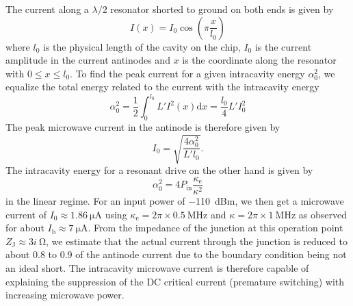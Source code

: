 The current along a $\lambda/2$ resonator shorted to ground on both ends is given by
%
\begin{equation}
I(x) = I_0\cos{\left(\pi\frac{x}{l_0}\right)}
\end{equation}
%
where $l_0$ is the physical length of the cavity on the chip, $I_0$ is the current amplitude in the current antinodes and $x$ is the coordinate along the resonator with $0 \leq x \leq l_0$.
%
To find the peak current for a given intracavity energy $\alpha_0^2$, we equalize the total energy related to the current with the intracavity energy
%
\begin{equation}
\alpha_0^2 = \frac{1}{2}\int_0^{l_0}L' I^2(x)\text{d}x = \frac{l_0}{4}L' I_0^2
\end{equation}
%
The peak microwave current in the antinode is therefore given by
%
\begin{equation}
I_0 = \sqrt{\frac{4 \alpha_0^2}{L' l_0}}.
\end{equation}
%
The intracavity energy for a resonant drive on the other hand is given by
%
\begin{equation}
\alpha_0^2 = 4P_\text{in} \frac{\kappa_\text{e}}{\kappa^2}
\end{equation}
%
in the linear regime.
%
For an input power of \SI{-110}{dBm}, we then get a microwave current of $I_0\approx\SI{1.86}{\micro\ampere}$ using $\kappa_\text{e} = 2\pi\times\SI{0.5}{\mega\hertz}$ and $\kappa = 2\pi\times\SI{1}{\mega\hertz}$ as observed for about $I_\text{b} \approx \SI{7}{\micro\ampere}$.
%
From the impedance of the junction at this operation point $Z_\text{J} \approx \SI{3i}{\ohm}$, we estimate that the actual current through the junction is reduced to about 0.8 to 0.9 of the antinode current due to the boundary condition being not an ideal short.
%
The intracavity microwave current is therefore capable of explaining the suppression of the DC critical current (premature switching) with increasing microwave power.


